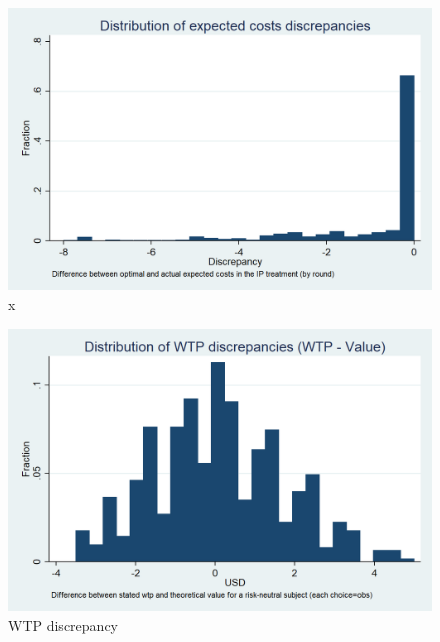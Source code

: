 \documentclass[11pt,a4paper]{article}
\begin{document}
\begin{figure}[!h]
\centering
\caption{x} \label{cost_discrepancy}

  \centering
  \includegraphics[scale=0.3]{Graphs/hist_costs_discr.png}

\end{figure}

\begin{figure}[!h]
\centering
\caption{WTP discrepancy} \label{WTP_discrepancy}

  \centering
  \includegraphics[scale=0.3]{Graphs/hist_WTP_discr1.png}

\end{figure}
\end{document}
